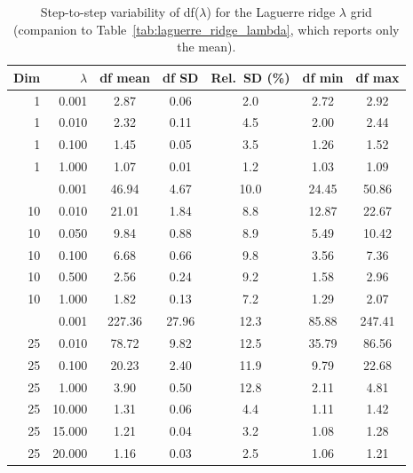 \begin{table}

\caption{\label{tab:laguerre_df_variability}Step-to-step variability of df($\lambda$) for the Laguerre ridge $\lambda$ grid (companion to Table~\ref{tab:laguerre_ridge_lambda}, which reports only the mean).}
\footnotesize
\setlength{\tabcolsep}{4pt}
\centering
\begin{tabular}[t]{rrccccc}
\toprule
Dim & $\lambda$ & df mean & df SD & Rel.\ SD (\%) & df min & df max\\
\midrule
1 & 0.001 & 2.87 & 0.06 & 2.0 & 2.72 & 2.92\\
1 & 0.010 & 2.32 & 0.11 & 4.5 & 2.00 & 2.44\\
1 & 0.100 & 1.45 & 0.05 & 3.5 & 1.26 & 1.52\\
1 & 1.000 & 1.07 & 0.01 & 1.2 & 1.03 & 1.09\\
\addlinespace
10 & 0.001 & 46.94 & 4.67 & 10.0 & 24.45 & 50.86\\
10 & 0.010 & 21.01 & 1.84 & 8.8 & 12.87 & 22.67\\
10 & 0.050 & 9.84 & 0.88 & 8.9 & 5.49 & 10.42\\
10 & 0.100 & 6.68 & 0.66 & 9.8 & 3.56 & 7.36\\
10 & 0.500 & 2.56 & 0.24 & 9.2 & 1.58 & 2.96\\
10 & 1.000 & 1.82 & 0.13 & 7.2 & 1.29 & 2.07\\
\addlinespace
25 & 0.001 & 227.36 & 27.96 & 12.3 & 85.88 & 247.41\\
25 & 0.010 & 78.72 & 9.82 & 12.5 & 35.79 & 86.56\\
25 & 0.100 & 20.23 & 2.40 & 11.9 & 9.79 & 22.68\\
25 & 1.000 & 3.90 & 0.50 & 12.8 & 2.11 & 4.81\\
25 & 10.000 & 1.31 & 0.06 & 4.4 & 1.11 & 1.42\\
25 & 15.000 & 1.21 & 0.04 & 3.2 & 1.08 & 1.28\\
25 & 20.000 & 1.16 & 0.03 & 2.5 & 1.06 & 1.21\\
\bottomrule
\end{tabular}
\end{table}
